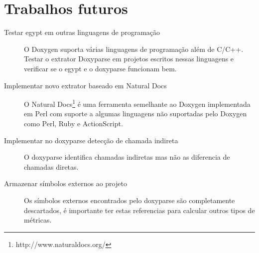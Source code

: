 \section{Trabalhos futuros}

\begin{description}

\item[Testar egypt em outras linguagens de programação]
O Doxygen suporta várias linguagens de programação além de C/C++. Testar o
extrator Doxyparse em projetos escritos nessas linguagens e verificar se o
egypt e o doxyparse funcionam bem.

\item[Implementar novo extrator baseado em Natural Docs]
O Natural Docs\footnote{http://www.naturaldocs.org/} é uma ferramenta
semelhante ao Doxygen implementada em Perl com suporte a algumas linguagens não
suportadas pelo Doxygen como Perl, Ruby e ActionScript.

\item[Implementar no doxyparse detecção de chamada indireta]
O doxyparse identifica chamadas indiretas mas não as diferencia de chamadas
diretas.

\item[Armazenar símbolos externos ao projeto]
Os símbolos externos encontrados pelo doxyparse são completamente descartados,
é importante ter estas referencias para calcular outros tipos de métricas.

\end{description}
